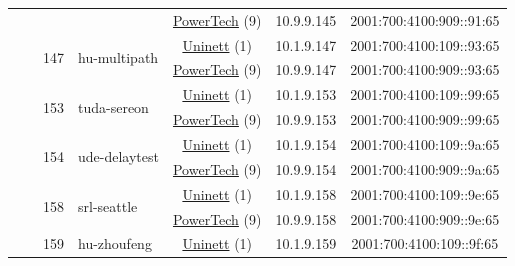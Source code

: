 \begin{small}
\begin{center}
\begin{longtable}{|c|c|c|c|c|c|c|c|}
  &  &  &  & \multicolumn{2}{|c|}{\tiny{\href{http://www.powertech.no}{PowerTech} (9)}} & \tiny{10.9.9.145} & \tiny{2001:700:4100:909::91:65} \\* \cline{3-3}\cline{4-4}\cline{5-5}\cline{6-6}\cline{7-7}\cline{8-8}
  &  & \multirow{2}{*}{\tiny{147}} & \multicolumn{1}{|l|}{\multirow{2}{*}{\tiny{hu-multipath}}} & \multicolumn{2}{|c|}{\tiny{\href{https://www.uninett.no}{Uninett} (1)}} & \tiny{10.1.9.147} & \tiny{2001:700:4100:109::93:65} \\* \cline{5-5}\cline{6-6}\cline{7-7}\cline{8-8}
  &  &  &  & \multicolumn{2}{|c|}{\tiny{\href{http://www.powertech.no}{PowerTech} (9)}} & \tiny{10.9.9.147} & \tiny{2001:700:4100:909::93:65} \\* \cline{3-3}\cline{4-4}\cline{5-5}\cline{6-6}\cline{7-7}\cline{8-8}
  &  & \multirow{2}{*}{\tiny{153}} & \multicolumn{1}{|l|}{\multirow{2}{*}{\tiny{tuda-sereon}}} & \multicolumn{2}{|c|}{\tiny{\href{https://www.uninett.no}{Uninett} (1)}} & \tiny{10.1.9.153} & \tiny{2001:700:4100:109::99:65} \\* \cline{5-5}\cline{6-6}\cline{7-7}\cline{8-8}
  &  &  &  & \multicolumn{2}{|c|}{\tiny{\href{http://www.powertech.no}{PowerTech} (9)}} & \tiny{10.9.9.153} & \tiny{2001:700:4100:909::99:65} \\* \cline{3-3}\cline{4-4}\cline{5-5}\cline{6-6}\cline{7-7}\cline{8-8}
  &  & \multirow{2}{*}{\tiny{154}} & \multicolumn{1}{|l|}{\multirow{2}{*}{\tiny{ude-delaytest}}} & \multicolumn{2}{|c|}{\tiny{\href{https://www.uninett.no}{Uninett} (1)}} & \tiny{10.1.9.154} & \tiny{2001:700:4100:109::9a:65} \\* \cline{5-5}\cline{6-6}\cline{7-7}\cline{8-8}
  &  &  &  & \multicolumn{2}{|c|}{\tiny{\href{http://www.powertech.no}{PowerTech} (9)}} & \tiny{10.9.9.154} & \tiny{2001:700:4100:909::9a:65} \\* \cline{3-3}\cline{4-4}\cline{5-5}\cline{6-6}\cline{7-7}\cline{8-8}
  &  & \multirow{2}{*}{\tiny{158}} & \multicolumn{1}{|l|}{\multirow{2}{*}{\tiny{srl-seattle}}} & \multicolumn{2}{|c|}{\tiny{\href{https://www.uninett.no}{Uninett} (1)}} & \tiny{10.1.9.158} & \tiny{2001:700:4100:109::9e:65} \\* \cline{5-5}\cline{6-6}\cline{7-7}\cline{8-8}
  &  &  &  & \multicolumn{2}{|c|}{\tiny{\href{http://www.powertech.no}{PowerTech} (9)}} & \tiny{10.9.9.158} & \tiny{2001:700:4100:909::9e:65} \\* \cline{3-3}\cline{4-4}\cline{5-5}\cline{6-6}\cline{7-7}\cline{8-8}
  &  & \multirow{2}{*}{\tiny{159}} & \multicolumn{1}{|l|}{\multirow{2}{*}{\tiny{hu-zhoufeng}}} & \multicolumn{2}{|c|}{\tiny{\href{https://www.uninett.no}{Uninett} (1)}} & \tiny{10.1.9.159} & \tiny{2001:700:4100:109::9f:65} \\* \cline{5-5}\cline{6-6}\cline{7-7}\cline{8-8}

\end{longtable}
\end{center}
\end{small}
